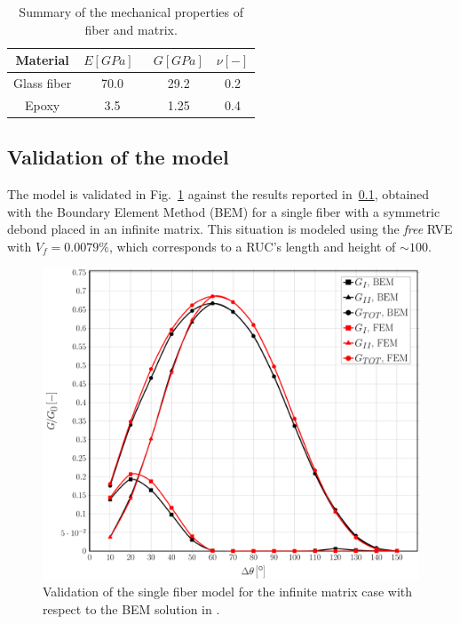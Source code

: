 \documentclass[review]{elsarticle}
\begin{document}
\begin{table}[!htbp]
 \centering
 \caption{Summary of the mechanical properties of fiber and matrix.}
 \begin{tabular}{cccc}
\textbf{Material} & \textbf{$E\left[GPa\right]$}\ & \textbf{$G\left[GPa\right]$} & \textbf{$\nu\left[-\right]$} \\
\midrule
Glass fiber    & 70.0  & 29.2   & 0.2  \\
Epoxy    & 3.5    & 1.25   & 0.4  
\end{tabular}
\label{tab:phaseprop}
\end{table}

\subsection{Validation of the model}

The model is validated in Fig.~\ref{fig:validation} against the results reported in~\ref{}, obtained with the Boundary Element Method (BEM) for a single fiber with a symmetric debond placed in an infinite matrix. This situation is modeled using the \textit{free} RVE with $V_{f}=0.0079\%$, which corresponds to a RUC's length and height of $\sim 100$.

\begin{figure}[!h]
\centering
\includegraphics[width=\textwidth]{validation-VCCT.pdf}
\caption{Validation of the single fiber model for the infinite matrix case with respect to the BEM solution in \cite{}.}\label{fig:validation}
\end{figure}
\end{document}

